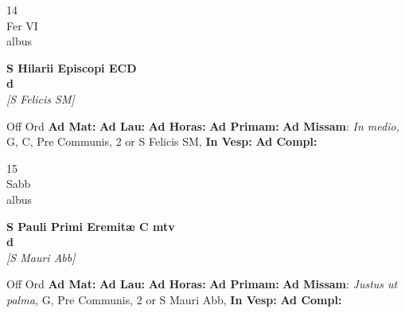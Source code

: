 \documentclass[10pt, openany]{book}
\begin{document}
    \begin{center}
        \begin{minipage}{3.5in}
            \vspace{2em}
            \begin{minipage}{0.5in}
                {\Huge 14} \\
                {\normalsize Fer VI} \\
                {\normalsize albus}
            \end{minipage}
            \begin{minipage}{3.0in}
                \textbf{ \large S Hilarii Episcopi ECD \\
                \textnormal{\normalsize d}} \\ \textit{[S Felicis SM]} \\ 
            \end{minipage}
            \begin{justify}Off Ord
                \textbf{Ad Mat: }
                \textbf{Ad Lau: }
                \textbf{Ad Horas: }
                \textbf{Ad Primam: }\textbf{Ad Missam}: \textit{In medio,} G, C, Pre Communis, 2 or S Felicis SM,  
                \textbf{In Vesp: }
                \textbf{Ad Compl: }
            \end{justify}
        \end{minipage}
    \end{center}

    \begin{center}
        \begin{minipage}{3.5in}
            \vspace{2em}
            \begin{minipage}{0.5in}
                {\Huge 15} \\
                {\normalsize Sabb} \\
                {\normalsize albus}
            \end{minipage}
            \begin{minipage}{3.0in}
                \textbf{ \large S Pauli Primi Eremitæ C mtv \\
                \textnormal{\normalsize d}} \\ \textit{[S Mauri Abb]} \\ 
            \end{minipage}
            \begin{justify}Off Ord
                \textbf{Ad Mat: }
                \textbf{Ad Lau: }
                \textbf{Ad Horas: }
                \textbf{Ad Primam: }\textbf{Ad Missam}: \textit{Justus ut palma,} G, Pre Communis, 2 or S Mauri Abb,  
                \textbf{In Vesp: }
                \textbf{Ad Compl: }
            \end{justify}
        \end{minipage}
    \end{center}
\end{document}
